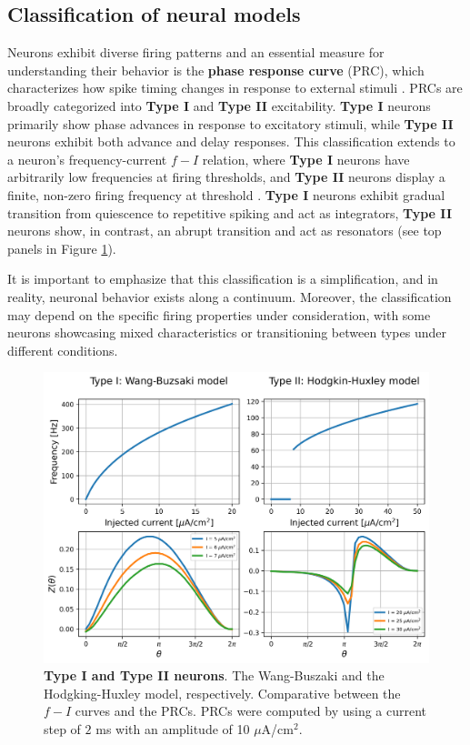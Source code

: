 \documentclass[../main.tex]{subfiles}
\begin{document}
\subsection{Classification of neural models}
Neurons exhibit diverse firing patterns and an essential measure for understanding their behavior is the \textbf{phase response curve} (PRC), which characterizes how spike timing changes in response to external stimuli \citep{hansel1995synchrony}.
PRCs are broadly categorized into \textbf{Type I} and \textbf{Type II} excitability.
\textbf{Type I} neurons primarily show phase advances in response to excitatory stimuli, while \textbf{Type II} neurons exhibit both advance and delay responses.
This classification extends to a neuron's frequency-current $f-I$ relation, where \textbf{Type I} neurons have arbitrarily low frequencies at firing thresholds, and \textbf{Type II} neurons display a finite, non-zero firing frequency at threshold \citep{ermentrout2001effects,schultheiss2011phase,fink_cellularly-driven_2011}.
\textbf{Type I} neurons exhibit  gradual transition from quiescence to repetitive spiking and act as integrators, \textbf{Type II }neurons show, in contrast, an abrupt transition and act as resonators \citep{izhikevich_dynamical_2007} (see top panels in Figure \ref{fig:PRC}).

It is important to emphasize that this classification is a simplification, and in reality, neuronal behavior exists along a continuum. Moreover, the classification may depend on the specific firing properties under consideration, with some neurons showcasing mixed characteristics or transitioning between types under different conditions.
\begin{figure}[!htb]
    \centering
    \includegraphics[width=\textwidth]{chapter1/figures/PRCs.png}
    \caption{\textbf{Type I and Type II neurons}.
    The Wang-Buszaki and the Hodgking-Huxley model, respectively.
    Comparative between the $f-I$ curves and the PRCs.
    PRCs were computed by using a current step of $2$ ms with an amplitude of 10 $\mu$A/cm$^2$.}
    \label{fig:PRC}
\end{figure}
\end{document}
